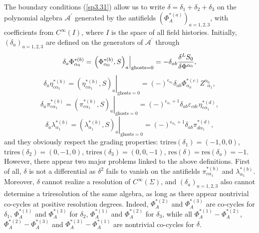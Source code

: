 \documentclass[a4paper,12pt]{article}
\begin{document}
The boundary conditions (\ref{sp3.31}) allow us to write $\delta =\delta
_{1}+\delta _{2}+\delta _{3}$ on the polynomial algebra $\mathcal{A}^{\prime
}$ generated by the antifields $\left( \Phi _{A}^{*(a)}\right) _{a=1,2,3}$,
with coefficients from $C^{\infty }\left( I\right) $, where $I$ is the space
of all field histories. Initially, $\left( \delta _{a}\right) _{a=1,2,3}$
are defined on the generators of $\mathcal{A}^{\prime }$ through 
\begin{equation}
\delta _{a}\Phi _{\alpha _{0}}^{*(b)}=\left. \left( \Phi _{\alpha
_{0}}^{*(b)},S\right) _{a}\right| _{\mathrm{ghosts}=0}=-\delta _{ab}\frac{%
\delta ^{L}S_{0}}{\delta \Phi ^{\alpha _{0}}},  \label{sp3.32}
\end{equation}
\begin{equation}
\delta _{a}\eta _{c\alpha _{1}}^{*(b)}=\left. \left( \eta _{c\alpha
_{1}}^{*(b)},S\right) _{a}\right| _{\mathrm{ghosts}=0}=\left( -\right)
^{\epsilon _{\alpha _{1}}}\delta _{ab}\Phi _{\alpha
_{0}}^{*(c)}Z_{\;\;\alpha _{1}}^{\alpha _{0}},  \label{sp3.33}
\end{equation}
\begin{equation}
\delta _{a}\pi _{c\alpha _{1}}^{*(b)}=\left. \left( \pi _{c\alpha
_{1}}^{*(b)},S\right) _{a}\right| _{\mathrm{ghosts}=0}=\left( -\right)
^{\epsilon _{\alpha _{1}}+1}\delta _{ab}\varepsilon _{cde}\eta _{e\alpha
_{1}}^{*(d)},  \label{sp3.34}
\end{equation}
\begin{equation}
\delta _{a}\lambda _{\alpha _{1}}^{*(b)}=\left. \left( \lambda _{\alpha
_{1}}^{*(b)},S\right) _{a}\right| _{\mathrm{ghosts}=0}=\left( -\right)
^{\epsilon _{\alpha _{1}}+1}\delta _{ab}\pi _{d\alpha _{1}}^{*(d)},
\label{sp3.35}
\end{equation}
and they obviously respect the grading properties: $\mathrm{trires}\left(
\delta _{1}\right) =\left( -1,0,0\right) $, $\mathrm{trires}\left( \delta
_{2}\right) =\left( 0,-1,0\right) $, $\mathrm{trires}\left( \delta
_{3}\right) =\left( 0,0,-1\right) $, $\mathrm{res}\left( \delta \right) =%
\mathrm{res}\left( \delta _{a}\right) =-1$. However, there appear two major
problems linked to the above definitions. First of all, $\delta $ is not a
differential as $\delta ^{2}$ fails to vanish on the antifields $\pi
_{c\alpha _{1}}^{*(b)}$ and $\lambda _{\alpha _{1}}^{*(b)}$. Moreover, $%
\delta $ cannot realize a resolution of $C^{\infty }\left( \Sigma \right) $,
and $\left( \delta _{a}\right) _{a=1,2,3}$ also cannot determine a
triresolution of the same algebra, as long as there appear nontrivial
co-cycles at positive resolution degrees. Indeed, $\Phi _{A}^{*(2)}$ and $%
\Phi _{A}^{*(3)}$ are co-cycles for $\delta _{1}$, $\Phi _{A}^{*(1)}$ and $%
\Phi _{A}^{*(3)}$ for $\delta _{2}$, $\Phi _{A}^{*(1)}$ and $\Phi
_{A}^{*(2)} $ for $\delta _{3}$, while all $\Phi _{A}^{*(1)}-\Phi
_{A}^{*(2)} $, $\Phi _{A}^{*(2)}-\Phi _{A}^{*(3)}$ and $\Phi
_{A}^{*(3)}-\Phi _{A}^{*(1)} $ are nontrivial co-cycles for $\delta $.
\end{document}
